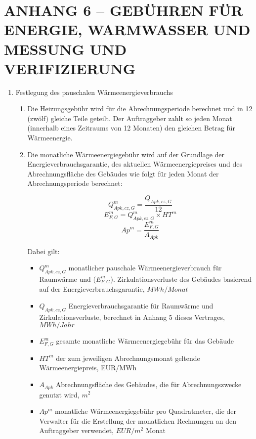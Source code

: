 \section{ANHANG 6 – GEBÜHREN FÜR ENERGIE, WARMWASSER UND MESSUNG UND VERIFIZIERUNG}

\begin{enumerate}

\item{Festlegung des pauschalen Wärmeenergieverbrauchs}

\begin{enumerate}
	\item Die Heizungsgebühr wird für die Abrechnungsperiode berechnet und in 12 (zwölf) gleiche Teile geteilt. Der Auftraggeber zahlt so jeden Monat (innerhalb eines Zeitraums von 12 Monaten) den gleichen Betrag für Wärmeenergie. 
        \item Die monatliche Wärmeenergiegebühr wird auf der Grundlage der Energieverbrauchsgarantie, des aktuellen Wärmeenergiepreises und des Abrechnungsfläche des Gebäudes wie folgt für jeden Monat der Abrechnungsperiode berechnet:

\[ Q^{m}_{Apk,cz,G} = \frac{Q_{Apk,cz,G}}{12} \]
\[ E^{m}_{F,G} = Q^{m}_{Apk,cz,G} \times HT^m \]
\[ Ap^m = \frac{E^{m}_{F,G} }{A_{Apk}} \]

Dabei gilt:

\begin{itemize}[label={}]
	\item $Q^{m}_{Apk,cz,G}$ \quad monatlicher pauschale Wärmeenergieverbrauch für Raumwärme und ($E^m_{F,G}$). Zirkulationsverluste des Gebäudes basierend auf der Energieverbrauchsgarantie, $MWh/Monat$
	\item $Q_{Apk,cz,G}$ \quad Energieverbrauchsgarantie für Raumwärme und Zirkulationsverluste, berechnet in Anhang 5 dieses Vertrages, $MWh/Jahr$
	\item $E^{m}_{F,G}$ \quad \quad gesamte monatliche Wärmeenergiegebühr für das Gebäude
	\item $HT^m$ \quad \quad der zum jeweiligen Abrechnungsmonat geltende Wärmeenergiepreis, EUR/MWh
	\item $A_{Apk}$ \quad \quad Abrechnungsfläche des Gebäudes, die für Abrechnungszwecke genutzt wird, $m^2$
	\item $Ap^m$ \quad \quad monatliche Wärmeenergiegebühr pro Quadratmeter, die der Verwalter für die Erstellung der monatlichen Rechnungen an den Auftraggeber verwendet, $EUR/m^2$ Monat
\end{itemize}


\end{enumerate}
\end{enumerate}
